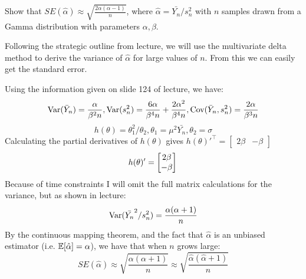 Show that $SE(\hat{\alpha}) \approx \sqrt{\frac{2\alpha(\alpha - 1)}{n}}$, where $\hat{\alpha} = \bar{Y_n}/s^2_n$ with $n$ samples drawn from a Gamma distribution with parameters $\alpha, \beta$.

Following the strategic outline from lecture, we will use the multivariate delta method to derive the variance of $\hat{\alpha}$ for large values of $n$.
From this we can easily get the standard error. 

Using the information given on slide 124 of lecture, we have:
\begin{equation*}
    \text{Var}(\bar{Y}_n) = \frac{\alpha}{\beta^2n}, \text{Var}(s^2_n) = \frac{6\alpha}{\beta^4n} + \frac{2\alpha^2}{\beta^4n}, \text{Cov}(\bar{Y}_n, s^2_n) = \frac{2\alpha}{\beta^3n} \\
\end{equation*}
\begin{equation*}
    h(\theta) = \theta_1^2/\theta_2, \theta_1 = \mu^2\bar{Y_n}, \theta_2 = \sigma
\end{equation*}
Calculating the partial derivatives of $h(\theta)$ gives $h(\theta)'^\intercal = \begin{bmatrix} 2\beta &-\beta \end{bmatrix}$
\begin{equation*}
h(\theta)'= 
    \begin{bmatrix}
       2\beta\\
       -\beta
    \end{bmatrix}\\
\end{equation*}
Because of time constraints I will omit the full matrix calculations for the variance, but as shown in lecture:
\begin{equation*}
    \text{Var}(\bar{Y_n}^2/s^2_n) =  \frac{\alpha(\alpha +1)}{n}
\end{equation*}
By the continuous mapping theorem, and the fact that $\hat{\alpha}$ is an unbiased estimator (i.e. $\mathbb{E}[\hat{\alpha}] = \alpha$), we have that when $n$ grows large:
\begin{equation*}
SE(\hat{\alpha})\approx \sqrt{\frac{\alpha(\alpha +1)}{n}}  \approx \sqrt{\frac{\hat{\alpha}(\hat{\alpha} +1)}{n}}
\end{equation*}


